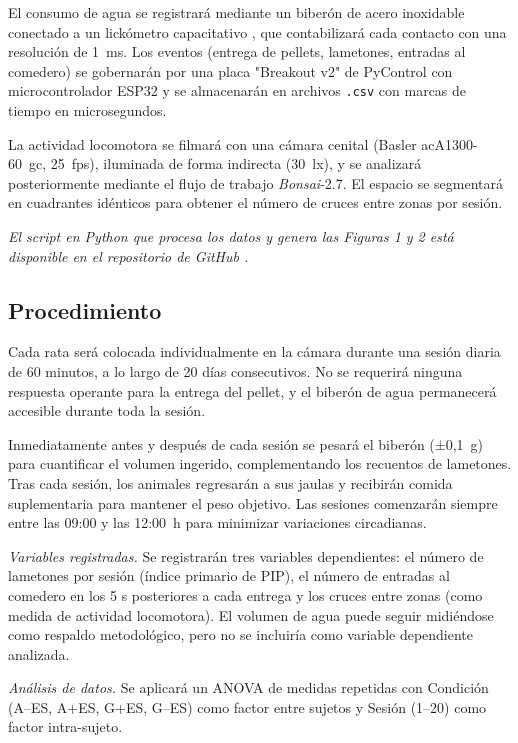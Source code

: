 \documentclass[12pt,a4paper]{article}
\begin{document}
\begin{multicols}{2}
El consumo de agua se registrará mediante un biberón de acero inoxidable conectado a un lickómetro capacitativo \citep{pycontrol_lickometer}, que contabilizará cada contacto con una resolución de 1~ms. Los eventos (entrega de pellets, lametones, entradas al comedero) se gobernarán por una placa "Breakout v2" de PyControl con microcontrolador ESP32 y se almacenarán en archivos \texttt{.csv} con marcas de tiempo en microsegundos.

La actividad locomotora se filmará con una cámara cenital (Basler acA1300-60~gc, 25~fps), iluminada de forma indirecta (30~lx), y se analizará posteriormente mediante el flujo de trabajo \textit{Bonsai}-2.7. El espacio se segmentará en cuadrantes idénticos para obtener el número de cruces entre zonas por sesión.

\textit{El script en Python que procesa los datos y genera las Figuras 1 y 2 está disponible en el repositorio de GitHub \citep{Pena2025}.
}

\subsection*{Procedimiento}

Cada rata será colocada individualmente en la cámara durante una sesión diaria de 60 minutos, a lo largo de 20 días consecutivos. No se requerirá ninguna respuesta operante para la entrega del pellet, y el biberón de agua permanecerá accesible durante toda la sesión.

Inmediatamente antes y después de cada sesión se pesará el biberón (±0,1~g) para cuantificar el volumen ingerido, complementando los recuentos de lametones. Tras cada sesión, los animales regresarán a sus jaulas y recibirán comida suplementaria para mantener el peso objetivo. Las sesiones comenzarán siempre entre las 09:00 y las 12:00~h para minimizar variaciones circadianas.

\textit{Variables registradas.} Se registrarán tres variables dependientes: el número de lametones por sesión (índice primario de PIP), el número de entradas al comedero en los 5 s posteriores a cada entrega y los cruces entre zonas (como medida de actividad locomotora). El volumen de agua puede seguir midiéndose como respaldo metodológico, pero no se incluiría como variable dependiente analizada.


\textit{Análisis de datos.} Se aplicará un ANOVA de medidas repetidas con Condición (A--ES, A+ES, G+ES, G--ES) como factor entre sujetos y Sesión (1–20) como factor intra-sujeto.


\end{multicols}
\end{document}
